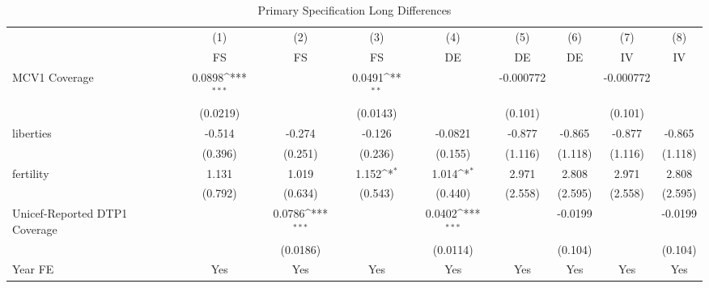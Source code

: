 \begin{table}[htbp]\centering
\def\sym#1{\ifmmode^{#1}\else\(^{#1}\)\fi}
\caption{Primary Specification Long Differences}
\begin{tabular}{l*{8}{c}}
\toprule
                &\multicolumn{1}{c}{(1)}&\multicolumn{1}{c}{(2)}&\multicolumn{1}{c}{(3)}&\multicolumn{1}{c}{(4)}&\multicolumn{1}{c}{(5)}&\multicolumn{1}{c}{(6)}&\multicolumn{1}{c}{(7)}&\multicolumn{1}{c}{(8)}\\
                &\multicolumn{1}{c}{FS}&\multicolumn{1}{c}{FS}&\multicolumn{1}{c}{FS}&\multicolumn{1}{c}{DE}&\multicolumn{1}{c}{DE}&\multicolumn{1}{c}{DE}&\multicolumn{1}{c}{IV}&\multicolumn{1}{c}{IV}\\
\midrule
MCV1 Coverage   &   0.0898\sym{***}&                  &   0.0491\sym{**} &                  &-0.000772         &                  &-0.000772         &                  \\
                & (0.0219)         &                  & (0.0143)         &                  &  (0.101)         &                  &  (0.101)         &                  \\
\addlinespace
liberties       &   -0.514         &   -0.274         &   -0.126         &  -0.0821         &   -0.877         &   -0.865         &   -0.877         &   -0.865         \\
                &  (0.396)         &  (0.251)         &  (0.236)         &  (0.155)         &  (1.116)         &  (1.118)         &  (1.116)         &  (1.118)         \\
\addlinespace
fertility       &    1.131         &    1.019         &    1.152\sym{*}  &    1.014\sym{*}  &    2.971         &    2.808         &    2.971         &    2.808         \\
                &  (0.792)         &  (0.634)         &  (0.543)         &  (0.440)         &  (2.558)         &  (2.595)         &  (2.558)         &  (2.595)         \\
\addlinespace
Unicef-Reported DTP1 Coverage&                  &   0.0786\sym{***}&                  &   0.0402\sym{***}&                  &  -0.0199         &                  &  -0.0199         \\
                &                  & (0.0186)         &                  & (0.0114)         &                  &  (0.104)         &                  &  (0.104)         \\
\addlinespace
Year FE         &      Yes         &      Yes         &      Yes         &      Yes         &      Yes         &      Yes         &      Yes         &      Yes         \\

\end{tabular}
\end{table}
